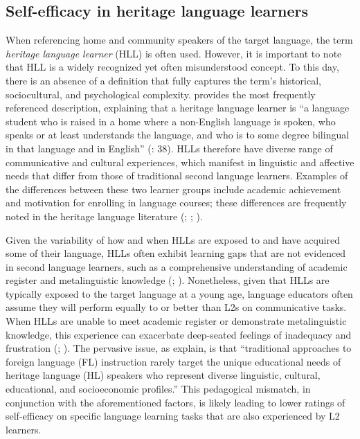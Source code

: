 \documentclass[output=paper]{langscibook}
\begin{document}
\subsection{{Self-efficacy in heritage language learners}}

When referencing home and community speakers of the target language, the term \textit{heritage language learner} (HLL) is often used. However, it is important to note that HLL is a widely recognized yet often misunderstood concept. To this day, there is an absence of a definition that fully captures the term’s historical, sociocultural, and psychological complexity. \citet{Valdés2001} provides the most frequently referenced description, explaining that a heritage language learner is “a language student who is raised in a home where a non-English language is spoken, who speaks or at least understands the language, and who is to some degree bilingual in that language and in English” (\citeyear{Valdés2001}: 38). HLLs therefore have diverse range of communicative and cultural experiences, which manifest in linguistic and affective needs that differ from those of traditional second language learners. Examples of the differences between these two learner groups include academic achievement and motivation for enrolling in language courses; these differences are frequently noted in the heritage language literature (\citealt{HedgcockLefkowitz2016}; \citealt{TorresTurner2015}; \citealt{Tallon2009}).

Given the variability of how and when HLLs are exposed to and have acquired some of their language, HLLs often exhibit learning gaps that are not evidenced in second language learners, such as a comprehensive understanding of academic register and metalinguistic knowledge (\citealt{HedgcockLefkowitz2016}; \citealt{TorresTurner2015}). Nonetheless, given that HLLs are typically exposed to the target language at a young age, language educators often assume they will perform equally to or better than L2s on communicative tasks. When HLLs are unable to meet academic register or demonstrate metalinguistic knowledge, this experience can exacerbate deep-seated feelings of inadequacy and frustration (\citealt{CoryellClark2009}; \citealt{Tallon2009}). The pervasive issue, as \citet[2]{HedgcockLefkowitz2016} explain, is that “traditional approaches to foreign language (FL) instruction rarely target the unique educational needs of heritage language (HL) speakers who represent diverse linguistic, cultural, educational, and socioeconomic profiles.” This pedagogical mismatch, in conjunction with the aforementioned factors, is likely leading to lower ratings of self-efficacy on specific language learning tasks that are also experienced by L2 learners.
\end{document}
